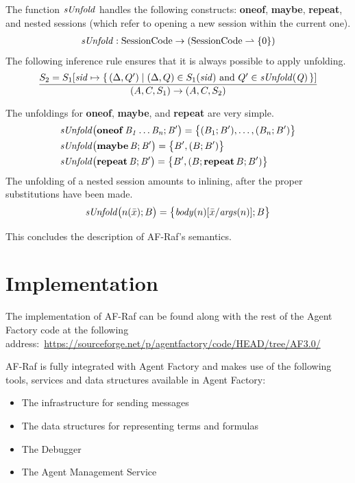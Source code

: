 \documentclass[a4paper,12pt,oneside,fleqn]{book} %
\newcommand{\pmap}{\rightharpoonup}
\begin{document}
The function $\it sUnfold$ handles the following constructs: {\bf oneof},
{\bf maybe}, {\bf repeat}, and nested sessions (which refer to opening a
new session within the current one).
\begin{align}
{\it sUnfold} : {\rm SessionCode}\to({\rm SessionCode}\pmap\{0\})
\end{align}
The following inference rule ensures that it is always possible to apply
unfolding.
\begin{align}
\frac
  {S_2=S_1[{\it sid}\mapsto\{\,(\Delta,Q')
    \mid\text{$(\Delta,Q)\in S_1({\it sid})$ and $Q'\in{\it sUnfold(Q)}$}\,\}]}
  {(A,C,S_1)\to(A,C,S_2)}
\end{align}

The unfoldings for {\bf oneof}, {\bf maybe}, and {\bf repeat} are very
simple.
\begin{align}
&{\it sUnfold\bigl({\bf oneof}\,B_1\ldots B_n; B'\bigr)}
  = \bigl\{ (B_1;B'),\ldots,(B_n;B')\bigr\}
\\
&{\it sUnfold\bigl({\bf maybe}\,B;B'\bigr)}
  = \bigl\{ B', (B;B')\bigr\} \\
&{\it sUnfold\bigl({\bf repeat}\,B;B'\bigr)}
  = \bigl\{ B', (B;{\bf repeat}\,B;B')\bigr\}
\end{align}
The unfolding of a nested session amounts to inlining, after the proper
substitutions have been made.
\begin{align}
{\it sUnfold}\bigl(n(\bar{x}); B\bigr)
  = \bigl\{ {\it body}(n)[\bar{x}/{\it args}(n)]; B \bigr\}
\end{align}

This concludes the description of AF-Raf's semantics.

\chapter{Implementation}\label{ch:implem} %

The implementation of AF-Raf can be found along with the rest of
the Agent Factory code at the following
address:~\url{https://sourceforge.net/p/agentfactory/code/HEAD/tree/AF3.0/}

AF-Raf is fully integrated with Agent Factory and makes use of the
following tools, services and data structures available in Agent Factory:

\begin{itemize}
    \item The infrastructure for sending messages
    \item The data structures for representing terms and formulas
    \item The Debugger
    \item The Agent Management Service
\end{itemize}
\end{document}
